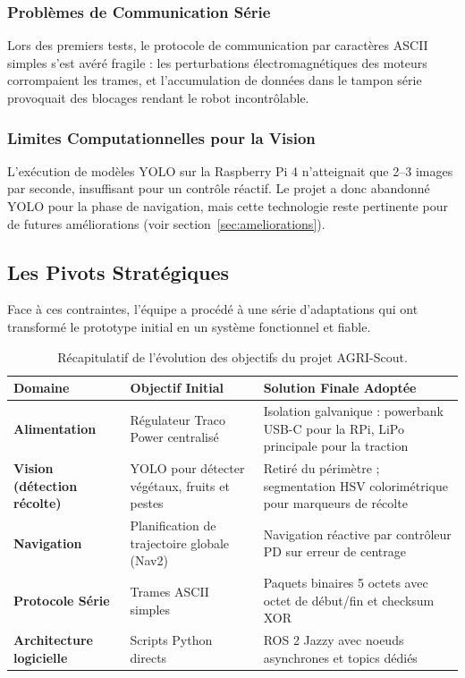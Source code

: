 \subsubsection{Problèmes de Communication Série}

Lors des premiers tests, le protocole de communication par caractères ASCII simples s'est avéré fragile : les perturbations électromagnétiques des moteurs corrompaient les trames, et l'accumulation de données dans le tampon série provoquait des blocages rendant le robot incontrôlable.

\subsubsection{Limites Computationnelles pour la Vision}

L'exécution de modèles YOLO sur la Raspberry Pi 4 n'atteignait que 2--3 images par seconde, insuffisant pour un contrôle réactif. Le projet a donc abandonné YOLO pour la phase de navigation, mais cette technologie reste pertinente pour de futures améliorations (voir section~\ref{sec:ameliorations}).

\subsection{Les Pivots Stratégiques}

Face à ces contraintes, l'équipe a procédé à une série d'adaptations qui ont transformé le prototype initial en un système fonctionnel et fiable.

\begin{table}[H]
\centering
\caption{Récapitulatif de l'évolution des objectifs du projet AGRI-Scout.}
\label{tab:evolution}
\renewcommand{\arraystretch}{1.4}
\begin{tabularx}{\textwidth}{|>{\bfseries}p{3.5cm}|X|X|}
\hline
\rowcolor{headerblue!20}
\textbf{Domaine} & \textbf{Objectif Initial} & \textbf{Solution Finale Adoptée} \\
\hline
Alimentation & Régulateur Traco Power centralisé & Isolation galvanique : powerbank USB-C pour la RPi, LiPo principale pour la traction \\
\hline
\rowcolor{rowalt}
Vision (détection récolte) & YOLO pour détecter végétaux, fruits et pestes & Retiré du périmètre ; segmentation HSV colorimétrique pour marqueurs de récolte \\
\hline
Navigation & Planification de trajectoire globale (Nav2) & Navigation réactive par contrôleur PD sur erreur de centrage \\
\hline
\rowcolor{rowalt}
Protocole Série & Trames ASCII simples & Paquets binaires 5 octets avec octet de début/fin et checksum XOR \\
\hline
Architecture logicielle & Scripts Python directs & ROS 2 Jazzy avec noeuds asynchrones et topics dédiés \\
\hline
\end{tabularx}
\end{table}
